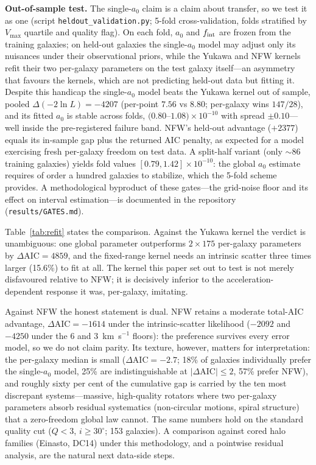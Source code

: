 \documentclass[11pt,a4paper]{article}
\begin{document}
\textbf{Out-of-sample test.}
The single-$a_0$ claim is a claim about transfer, so we test it as
one (script \texttt{heldout\_validation.py}; 5-fold
cross-validation, folds stratified by $V_{\max}$ quartile and
quality flag).  On each fold, $a_0$ and $f_{\rm int}$ are frozen
from the training galaxies; on held-out galaxies the single-$a_0$
model may adjust only its nuisances under their observational
priors, while the Yukawa and NFW kernels refit their two per-galaxy
parameters on the test galaxy itself---an asymmetry that favours the
kernels, which are not predicting held-out data but fitting it.
Despite this handicap the single-$a_0$ model beats the Yukawa kernel
out of sample, pooled $\Delta(-2\ln L) = -4207$ (per-point $7.56$
vs $8.80$; per-galaxy wins $147/28$), and its fitted $a_0$ is stable
across folds, $(0.80$--$1.08)\times10^{-10}$ with spread
$\pm0.10$---well inside the pre-registered failure band.  NFW's
held-out advantage ($+2377$) equals its in-sample gap plus the
returned AIC penalty, as expected for a model exercising fresh
per-galaxy freedom on test data.  A split-half variant (only
$\sim86$ training galaxies) yields fold values
$[0.79, 1.42]\times10^{-10}$: the global $a_0$ estimate requires
of order a hundred galaxies to stabilize, which the 5-fold scheme
provides.  A methodological byproduct of these gates---the
grid-noise floor and its effect on interval estimation---is
documented in the repository (\texttt{results/GATES.md}).

Table~\ref{tab:refit} states the comparison.
Against the Yukawa kernel the verdict is unambiguous: one global
parameter outperforms $2\times175$ per-galaxy parameters by
$\Delta\mathrm{AIC} = 4859$, and the fixed-range kernel needs an
intrinsic scatter three times larger (15.6\%) to fit at all.
The kernel this paper set out to test is not merely disfavoured
relative to NFW; it is decisively inferior to the
acceleration-dependent response it was, per-galaxy, imitating.

Against NFW the honest statement is dual.
NFW retains a moderate total-AIC advantage,
$\Delta\mathrm{AIC} = -1614$ under the intrinsic-scatter
likelihood ($-2092$ and $-4250$ under the 6 and 3~km~s$^{-1}$
floors): the preference survives every error model, so we do not
claim parity.
Its texture, however, matters for interpretation: the per-galaxy
median is small ($\Delta\mathrm{AIC} = -2.7$; 18\% of galaxies
individually prefer the single-$a_0$ model, 25\% are
indistinguishable at $|\Delta\mathrm{AIC}| \le 2$, 57\% prefer
NFW), and roughly sixty per cent of the cumulative gap is carried
by the ten most discrepant systems---massive, high-quality rotators
where two per-galaxy parameters absorb residual systematics
(non-circular motions, spiral structure) that a zero-freedom global
law cannot.
The same numbers hold on the standard quality cut
($Q < 3$, $i \ge 30^\circ$; 153 galaxies).
A comparison against cored halo families (Einasto, DC14) under this
methodology, and a pointwise residual analysis, are the natural
next data-side steps.
\end{document}
